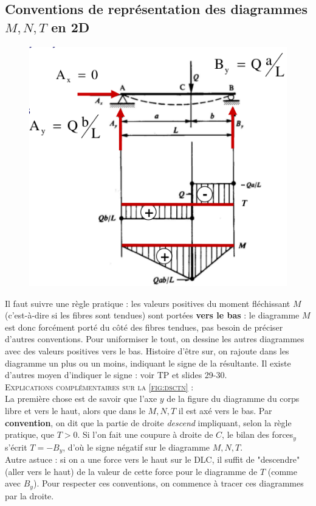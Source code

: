 	\subsection{Conventions de représentation des diagrammes $M, N, T$ 
	en 2D}
	\begin{figure}
	\vspace{-8mm}
	\includegraphics[scale=0.45]{ch2/image8.png}
	\label{fig:dsctn}
	\end{figure}	
	Il faut suivre une règle pratique : les valeurs positives du 
	moment fléchissant $M$ (c'est-à-dire si les fibres sont tendues) 
	sont portées \textbf{vers le bas} : le diagramme $M$ est donc 
	forcément porté du côté des fibres tendues, pas besoin de préciser 
	d'autres conventions. Pour uniformiser le tout, on dessine les autres 
	diagrammes avec des valeurs positives vers le bas. Histoire d'être 
	sur, on rajoute dans les diagramme un plus ou un moins, indiquant 
	le signe de la résultante. Il existe d'autres moyen d'indiquer 
	le signe : voir TP et slides 29-30. \\
	
	\textsc{Explications complémentaires sur la \autoref{fig:dsctn}} : \\
	La première chose est de savoir que l'axe $y$ de la figure du 
	diagramme du corps libre et vers le haut, alors que dans le 
	$M,N,T$ il est axé vers le bas. Par \textbf{convention}, on dit 
	que la partie de droite \textit{descend} impliquant, selon la 
	règle pratique, que $T>0$. Si l'on fait une coupure à droite de 
	$C$, le bilan des forces$_y$ s'écrit $T=-B_y$, d'où le signe 
	négatif sur le diagramme $M,N,T$.\\
	Autre astuce : si on a une force vers le haut sur le DLC, il 
	suffit de "descendre" (aller vers le haut) de la valeur de cette 
	force pour le diagramme de $T$ (comme avec $B_y$). Pour respecter 
	ces conventions, on commence à tracer ces diagrammes par la 
	droite.\\
	
